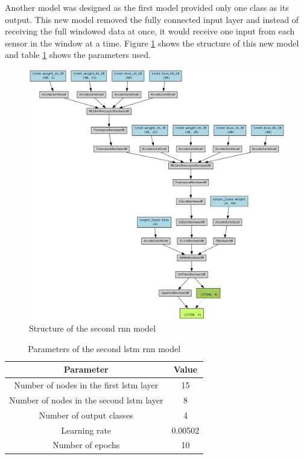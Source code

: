 Another model was designed as the first model provided only one class as its output. This new model removed the fully connected
input layer and instead of receiving the full windowed data at once, it would receive one input from each sensor in the window at a time.
Figure \ref{fig:rnn_struct2} shows the structure of this new model and table \ref{table:rnn_params2} shows the parameters used.

\begin{figure}[h]
    \centering
    \includegraphics[scale=0.21]{images/rnn_struct_2.png}
    \caption{Structure of the second \acrshort{rnn} model}
    \label{fig:rnn_struct2}
\end{figure}

\begin{table}[h]
    \centering
    \caption{Parameters of the second \acrshort{lstm} \acrshort{rnn} model}
    \label{table:rnn_params2}
    \begin{tabular}{|c|c|}
        \hline
        \textbf{Parameter} & \textbf{Value} \\ \hline
        Number of nodes in the first \acrshort{lstm} layer & 15 \\ \hline
        Number of nodes in the second \acrshort{lstm} layer & 8 \\ \hline
        Number of output classes & 4 \\ \hline
        Learning rate & 0.00502 \\ \hline
        Number of epochs & 10 \\ \hline
    \end{tabular}
\end{table}

